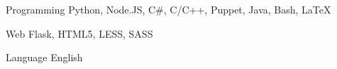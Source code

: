 

\begin{cvskills}

	\cvskill
	{Programming} %
	{Python, Node.JS, C\#, C/C++, Puppet, Java, Bash, LaTeX} %

	\cvskill
	{Web} %
	{Flask, HTML5, LESS, SASS} %

	\cvskill
	{Language} %
	{English} %

\end{cvskills}
